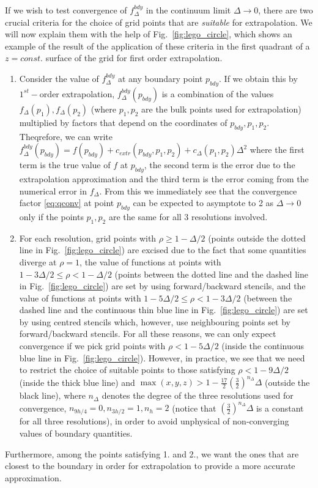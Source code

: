 \documentclass[a4paper,11pt]{article}
\begin{document}
If we wish to test convergence of $f^{bdy}_{\Delta}$ in the continuum limit $\Delta\rightarrow0$, there are two crucial criteria for the choice of grid points that are \emph{suitable} for extrapolation. We will now explain them with the help of Fig.~\ref{fig:lego_circle}, which shows an example of the result of the application of these criteria in the first quadrant of a $z=const.$ surface of the grid for first order extrapolation.
\begin{enumerate}
 \item Consider the value of $f^{bdy}_{\Delta}$ at any boundary point $p_{bdy}$. If we obtain this by $1^{st}-$order extrapolation, $f^{bdy}_{\Delta}(p_{bdy})$ is a combination of the values $f_\Delta(p_1),f_\Delta(p_2)$ (where $p_1,p_2$ are the bulk points used for extrapolation) multiplied by factors that depend on the coordinates of $p_{bdy},p_1,p_2$. Theqrefore, we can write  $f^{bdy}_{\Delta}(p_{bdy})=f(p_{bdy})+c_{extr}(p_{bdy},p_1,p_2)+c_\Delta(p_1,p_2)\Delta^2$ where the first term is the true value of $f$ at $p_{bdy}$, the second term is the error due to the extrapolation approximation and the third term is the error coming from the numerical error in $f_\Delta$. From this we immediately see that the convergence factor \eqref{eq:qconv} at point $p_{bdy}$ can be expected to asymptote to 2 as $\Delta\rightarrow0$ only if the points $p_1,p_2$ are the same for all 3 resolutions involved.
 
 
\item For each resolution, grid points with $\rho\geq 1-\Delta/2$ (points outside the dotted line in Fig.~\ref{fig:lego_circle}) are excised due to the fact that some quantities diverge at $\rho=1$, the value of functions at points with $1-3\Delta/2\leq \rho < 1-\Delta/2$ (points between the dotted line and the dashed line in Fig.~\ref{fig:lego_circle}) are set by using forward/backward stencils, and the value of functions at points with $1-5\Delta/2\leq \rho < 1-3\Delta/2$ (between the dashed line and the continuous thin blue line in Fig.~\ref{fig:lego_circle}) are set by using centred stencils which, however, use neighbouring points set by forward/backward stencils. For all these reasons, we can only expect convergence if we pick grid points with  $\rho<1-5\Delta/2$ (inside the continuous blue line in Fig.~\ref{fig:lego_circle}). However, in practice, we see that we need to restrict the choice of suitable points to those satisfying $\rho<1-9\Delta/2$ (inside the thick blue line) and $\max(x,y,z)>1-\frac{17}{2}\left(\frac{3}{2}\right)^{n_\Delta}\Delta$ (outside the black line), where $n_\Delta$ denotes the degree of the three resolutions used for convergence, $n_{9h/4}=0,n_{3h/2}=1,n_{h}=2$ (notice that $\left(\frac{3}{2}\right)^{n_\Delta}\Delta$ is a constant for all three resolutions), in order to avoid unphysical of non-converging values of boundary quantities.
 \end{enumerate}
Furthermore, among the points satisfying 1. and 2., we want the ones that are closest to the boundary in order for extrapolation to provide a more accurate approximation.
\end{document}
